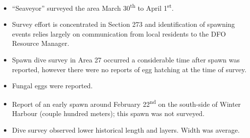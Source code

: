 \begin{itemize}
\item ``Seaveyor'' surveyed the area March 30\textsuperscript{th} to April 1\textsuperscript{st}.
\item Survey effort is concentrated in Section 273 and identification of spawning events relies largely on communication from local residents to the DFO Resource Manager.
\item Spawn dive survey in Area 27 occurred a considerable time after spawn was reported, however there were no reports of egg hatching at the time of survey.
\item Fungal eggs were reported.
\item Report of an early spawn around February 22\textsuperscript{nd} on the south-side of Winter Harbour (couple hundred meters); this spawn was not surveyed.
\item Dive survey observed lower historical length and layers. Width was average.
\end{itemize}